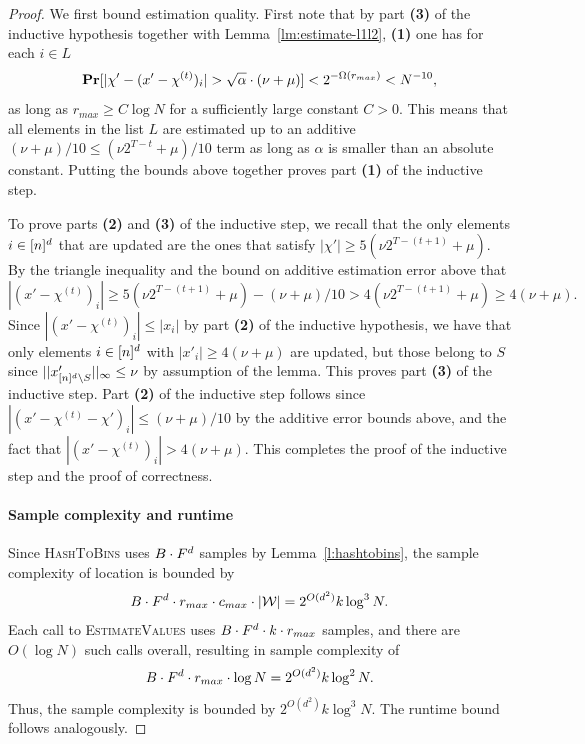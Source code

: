 \begin{proof}
We first bound estimation quality. First note that by part {\bf (3)} of the inductive hypothesis together with Lemma~\ref{lm:estimate-l1l2}, {\bf (1)} one has for each $i\in L$
$$
\prob[|\chi'- (x'-\chi^{(t)})_i|>\sqrt{\alpha}\cdot (\nu+\mu)]<2^{-\Omega(r_{max})}<N^{-10},
$$
as long as $r_{max}\geq C\log N$ for a sufficiently large constant $C>0$.
This means that all elements in the list $L$ are estimated up to an additive $(\nu+\mu)/10\leq (\nu 2^{T-t}+\mu)/10$ term as long as $\alpha$ is smaller than an absolute constant. Putting the bounds above together proves part {\bf (1)} of the inductive step. 

To prove parts {\bf (2)} and {\bf (3)} of the inductive step, we recall that the only elements $i\in {[n]^d}$ that are updated are the ones that satisfy $|\chi'|\geq 5(\nu 2^{T-(t+1)}+\mu)$. By the triangle inequality and the bound on additive estimation error above that 
$$
|(x'-\chi^{(t)})_i|\geq 5(\nu 2^{T-(t+1)}+\mu)-(\nu +\mu)/10> 4(\nu 2^{T-(t+1)}+\mu)\geq 4(\nu+\mu).
$$
Since $|(x'-\chi^{(t)})_i|\leq |x_i|$ by part {\bf (2)} of the inductive hypothesis, we have that only elements $i\in {[n]^d}$ with  $|x'_i|\geq 4(\nu+\mu)$ are updated, but those belong to $S$ since $||x'_{{[n]^d}\setminus S}||_\infty\leq \nu$ by assumption of the lemma. This proves part {\bf (3)} of the inductive step. Part {\bf (2)} of the inductive step follows since
$|(x'-\chi^{(t)}-\chi')_i|\leq (\nu +\mu)/10$ by the additive error bounds above, and the fact that $|(x'-\chi^{(t)})_i|>4(\nu+\mu)$. This completes the proof of the inductive step and the proof of correctness. 

\paragraph{Sample complexity and runtime} Since \textsc{HashToBins} uses $B\cdot F^d$  samples by Lemma~\ref{l:hashtobins}, the sample complexity of location is bounded by
$$
B\cdot F^d\cdot r_{max}\cdot c_{max}\cdot |\mathcal{W}|=2^{O(d^2)} k\log^3 N.
$$
Each call to \textsc{EstimateValues} uses $B\cdot F^d\cdot k \cdot r_{max}$ samples, and there are $O(\log N)$ such calls overall, resulting in sample complexity of 
$$
B\cdot F^d \cdot r_{max}\cdot \log N=2^{O(d^2)} k\log^2 N.
$$
Thus, the sample complexity is bounded by $2^{O(d^2)} k\log^3 N$. The runtime bound follows analogously.
\end{proof}

